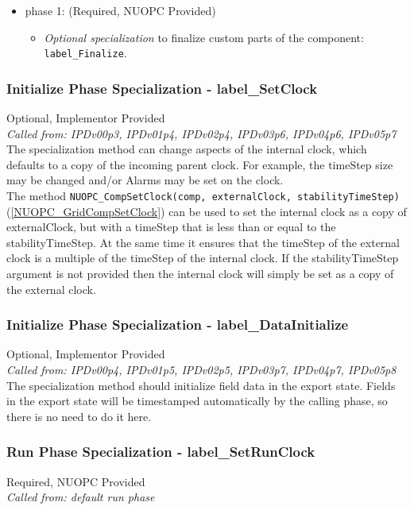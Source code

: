 \begin{itemize}
\item phase 1: ({\sc Required, NUOPC Provided})
  \begin{itemize}
  \item {\it Optional specialization} to finalize custom parts of the component: {\tt label\_Finalize}.
  \end{itemize}      
\end{itemize}

\subsubsection{Initialize Phase Specialization - label\_SetClock}
{\sc Optional, Implementor Provided}\\
{\em Called from: IPDv00p3, IPDv01p4, IPDv02p4, IPDv03p6, IPDv04p6, IPDv05p7}\\

The specialization method can change aspects of the internal clock, which defaults to a copy of the incoming parent clock. For example, the timeStep size may be changed and/or Alarms may be set on the clock.\\

The method {\tt NUOPC\_CompSetClock(comp, externalClock, stabilityTimeStep)} (\ref{NUOPC_GridCompSetClock}) can be used to set the internal clock as a copy of externalClock, but with a timeStep that is less than or equal to the stabilityTimeStep. At the same time it ensures that the timeStep of the external clock is a multiple of the timeStep of the internal clock. If the stabilityTimeStep argument is not provided then the internal clock will simply be set as a copy of the external clock.

\subsubsection{Initialize Phase Specialization - label\_DataInitialize}
{\sc Optional, Implementor Provided}\\
{\em Called from: IPDv00p4, IPDv01p5, IPDv02p5, IPDv03p7, IPDv04p7, IPDv05p8}\\

The specialization method should initialize field data in the export state. Fields in the export state will be timestamped automatically by the calling phase, so there is no need to do it here.

\subsubsection{Run Phase Specialization - label\_SetRunClock}
{\sc Required, NUOPC Provided}\\
{\em Called from: default run phase}\\

